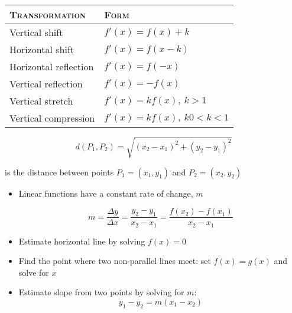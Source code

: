 
\vspace{.3em}
\begin{footnotesize}
  \begin{tabular}{ll}
  \centering
    \textsc{Transformation} & \textsc{Form} \\
    \midrule
    Vertical shift & $f'(x) = f(x) + k$ \\
    Horizontal shift & $f'(x) = f(x - k)$\\
    Horizontal reflection & $f'(x) = f(-x)$\\
    Vertical reflection & $f'(x) = -f(x)$  \\
    Vertical stretch     & $f'(x) = kf(x), ~ k > 1$ \\
    Vertical compression & $f'(x) = kf(x), ~ k 0 < k < 1$  \\
  \end{tabular}
\end{footnotesize}
\hformbar




\begin{equation}
	d(P_1, P_2) = \sqrt{(x_2 - x_1)^2 + (y_2 - y_1)^2}
\end{equation}


is the distance between points $P_1 = (x_1, y_1)$ and $P_2 = (x_2, y_2)$
\hformbar




\begin{itemize}
	\item Linear functions have a constant rate of change, $m$

		\begin{equation}
			m = \frac{\Delta y}{\Delta x} = \frac{y_2 - y_1}{x_2 - x_1} = \frac{f(x_2) - f(x_1)}{x_2 - x_1}
		\end{equation}
	\item Estimate horizontal line by solving $f(x) = 0$
	\item Find the point where two non-parallel lines meet: set $f(x) = g(x)$ and solve for $x$
	\item Estimate slope from two points by solving for $m$:
	    \begin{equation}
	        y_1 - y_2 = m(x_1 - x_2)
	    \end{equation}
\end{itemize}
\hformbar



